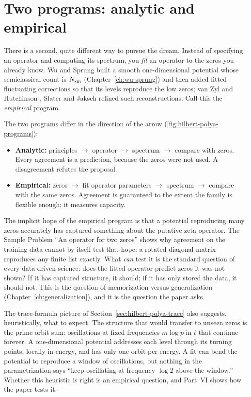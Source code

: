 \section{Two programs: analytic and empirical}\label{sec:hilbert-polya-programs}

There is a second, quite different way to pursue the dream. Instead of specifying an operator and computing its spectrum, you \emph{fit} an operator to the zeros you already know. Wu and Sprung \cite{wusprung} built a smooth one-dimensional potential whose semiclassical count is $N_{\mathrm{sm}}$ (Chapter~\ref{ch:wu-sprung}) and then added fitted fluctuating corrections so that its levels reproduce the low zeros; van Zyl and Hutchinson \cite{vanzyl}, Slater \cite{slater} and Jaksch \cite{jaksch} refined such reconstructions. Call this the \emph{empirical} program.

The two programs differ in the direction of the arrow (\cref{fig:hilbert-polya-programs}):
\begin{itemize}
\item \textbf{Analytic:} principles $\to$ operator $\to$ spectrum $\to$ compare with zeros. Every agreement is a prediction, because the zeros were not used. A disagreement refutes the proposal.
\item \textbf{Empirical:} zeros $\to$ fit operator parameters $\to$ spectrum $\to$ compare with the same zeros. Agreement is guaranteed to the extent the family is flexible enough; it measures capacity.
\end{itemize}

The implicit hope of the empirical program is that a potential reproducing many zeros accurately has captured something about the putative zeta operator. The Sample Problem ``An operator for two zeros'' shows why agreement on the training data cannot by itself test that hope: a rotated diagonal matrix reproduces any finite list exactly. What \emph{can} test it is the standard question of every data-driven science: does the fitted operator predict zeros it was not shown? If it has captured structure, it should; if it has only stored the data, it should not. This is the question of memorization versus generalization (Chapter~\ref{ch:generalization}), and it is the question the paper asks.

The trace-formula picture of Section~\ref{sec:hilbert-polya-trace} also suggests, heuristically, what to expect. The structure that would transfer to unseen zeros is the prime-orbit sum: oscillations at fixed frequencies $m\log p$ in $t$ that continue forever. A one-dimensional potential addresses each level through its turning points, locally in energy, and has only one orbit per energy. A fit can bend the potential to reproduce a window of oscillations, but nothing in the parametrization says ``keep oscillating at frequency $\log2$ above the window.'' Whether this heuristic is right is an empirical question, and Part~VI shows how the paper tests it.


